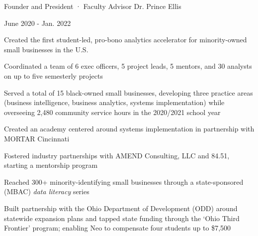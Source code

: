 \documentclass[a4paper,20pt]{article}
\begin{document}
    \begin{minipage}{.75\linewidth} \begin{flushleft}
    		Founder and President · Faculty Advisor Dr. Prince Ellis
    	\end{flushleft} \end{minipage}
    \hfill 
    \begin{minipage}{.20\linewidth}\begin{flushright}
    	 June 2020 - Jan. 2022
    	\end{flushright}\end{minipage}
        \vspace{-5pt}
	\begin{description}[font=$\bullet$]
	\item{Created the first student-led, pro-bono analytics accelerator for minority-owned small businesses in the U.S.}
        \vspace{-7pt}
        \item{Coordinated a team of 6 exec officers, 5 project leads, 5 mentors, and 30 analysts on up to five semesterly projects}
        \vspace{-7pt}
        \item{Served a total of 15 black-owned small businesses, developing three practice areas (business intelligence, business analytics, systems implementation) while overseeing 2,480 community service hours in the 2020/2021 school year}
        \vspace{-7pt}
        \item{Created an academy centered around systems implementation in partnership with MORTAR Cincinnati }
        \vspace{-7pt}
        \item{Fostered industry partnerships with AMEND Consulting, LLC and 84.51, starting a mentorship program}
        \vspace{-7pt}
        \item{Reached 300+ minority-identifying small businesses through a state-sponsored (MBAC) \textit{data literacy} series}
        \vspace{-7pt}
        \item{Built partnership with the Ohio Department of Development (ODD) around statewide expansion plans and tapped state funding through the ‘Ohio Third Frontier’ program; enabling Neo to compensate four students up to \$7,500}
\end{description}
\end{document}
